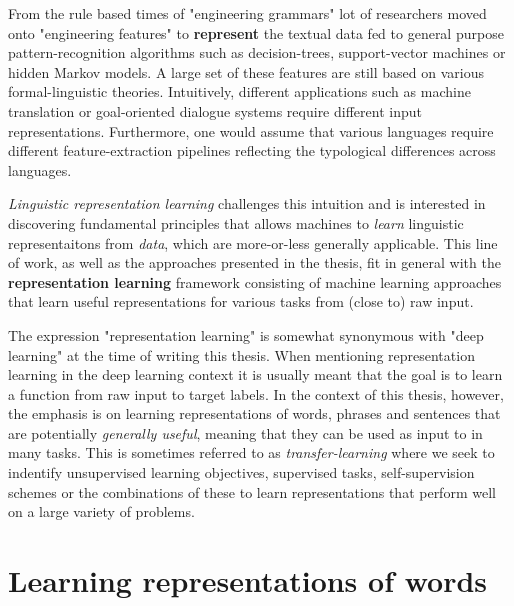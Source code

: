 From the rule based times of "engineering grammars" lot of researchers moved onto "engineering features"
to \textbf{represent} the textual data fed to general purpose pattern-recognition algorithms such as
decision-trees, support-vector machines or hidden Markov models. 
A large set of these features are still based on various formal-linguistic theories.
Intuitively, different applications such as machine translation or goal-oriented dialogue systems 
require different input representations. Furthermore, one would assume that various languages require 
different feature-extraction pipelines reflecting the typological differences across languages. 

\emph{Linguistic representation learning} challenges this intuition and is interested in 
discovering fundamental principles that allows machines to  \emph{learn} 
linguistic representaitons from \emph{data}, which are more-or-less
generally applicable. This line of work, as well as the approaches presented in the thesis,
fit in general with the \textbf{representation learning} 
framework consisting of machine learning approaches that learn useful representations 
for various tasks from (close to) raw input.

The expression "representation learning" is somewhat synonymous with "deep learning" at the time
of writing this thesis. When mentioning representation learning in the deep learning context
it is usually meant that the goal is to learn a function from raw input to target labels. In the 
context of this thesis, however, the emphasis is on learning representations of words, phrases and 
sentences that are potentially \emph{generally useful}, meaning 
that they can be used as input to in many tasks. This is sometimes referred to as 
\emph{transfer-learning} where we seek to indentify unsupervised learning objectives, 
supervised tasks, self-supervision schemes or the combinations of these to  learn representations that
perform well on a large variety of problems. 

\section{Learning representations of words}


